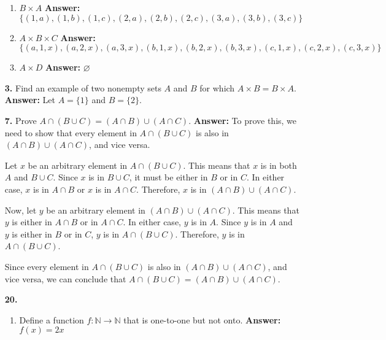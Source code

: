 \documentclass[12pt,reqno]{amsart}
\renewcommand{\emptyset}{\ensuremath{\varnothing}}
\begin{document}
\begin{enumerate}[{\bf 1.}]
\begin{multicols}{2}
\begin{enumerate}
\item
$B \times A$ \textbf{Answer:} $\{(1,a), (1,b), (1,c), (2,a), (2,b), (2,c), (3,a), (3,b), (3,c)\}$

\item
$A \times B \times C$ \textbf{Answer:} $\{(a,1,x), (a,2,x), (a,3,x), (b,1,x), (b,2,x), (b,3,x), (c,1,x), (c,2,x), (c,3,x)\}$

\item
$A \times D$ \textbf{Answer:} $\emptyset$

\end{enumerate}
\end{multicols}

\medskip  

\item[{\bf 3.}]
Find an example of two nonempty sets $A$ and $B$ for which $A \times B = B \times A$. \textbf{Answer:} Let $A = \{1\}$ and $B = \{2\}$.

\medskip

 
\item[{\bf 7.}]
Prove $A \cap (B \cup C) = (A \cap B) \cup (A \cap C)$. \textbf{Answer:} To prove this, we need to show that every element in $A \cap (B \cup C)$ is also in $(A \cap B) \cup (A \cap C)$, and vice versa.

Let $x$ be an arbitrary element in $A \cap (B \cup C)$. This means that $x$ is in both $A$ and $B \cup C$. Since $x$ is in $B \cup C$, it must be either in $B$ or in $C$. In either case, $x$ is in $A \cap B$ or $x$ is in $A \cap C$. Therefore, $x$ is in $(A \cap B) \cup (A \cap C)$.

Now, let $y$ be an arbitrary element in $(A \cap B) \cup (A \cap C)$. This means that $y$ is either in $A \cap B$ or in $A \cap C$. In either case, $y$ is in $A$. Since $y$ is in $A$ and $y$ is either in $B$ or in $C$, $y$ is in $A \cap (B \cup C)$. Therefore, $y$ is in $A \cap (B \cup C)$.

Since every element in $A \cap (B \cup C)$ is also in $(A \cap B) \cup (A \cap C)$, and vice versa, we can conclude that $A \cap (B \cup C) = (A \cap B) \cup (A \cap C)$.

\medskip

\item[{\bf 20.}]
\begin{enumerate}
  
\item
Define a function $f: {\mathbb N} \rightarrow {\mathbb N}$ that is one-to-one but not onto. \textbf{Answer:} $f(x) = 2x$


\end{enumerate}
\end{enumerate}
\end{document}

